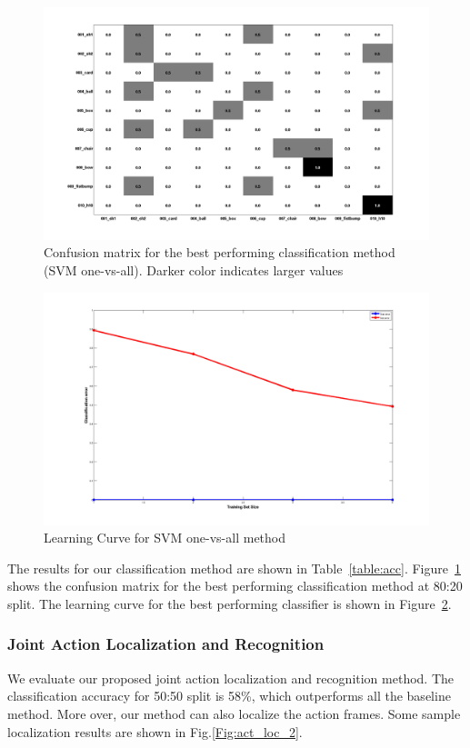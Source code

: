 \documentclass[10pt,twocolumn,letterpaper]{article}
\begin{document}
\begin{figure}[ht]
\includegraphics[scale=0.18]{conf_svm_ovr.png}
\caption{Confusion matrix for the best performing classification method (SVM one-vs-all). Darker color indicates larger values}
\label{Fig:conf_mat}
\end{figure}

\begin{figure}[ht]
\includegraphics[scale=0.1]{svm_ovr_lc.png}
\caption{Learning Curve for SVM one-vs-all method}

\label{Fig:lc}
\end{figure}

The results for our classification method are shown in Table~\ref{table:acc}. Figure~\ref{Fig:conf_mat} shows the confusion matrix for the best performing classification method at 80:20 split. The learning curve for the best performing classifier is shown in Figure~\ref{Fig:lc}.

\subsubsection{Joint Action Localization and Recognition}
We evaluate our proposed joint action localization and recognition method. The classification accuracy for 50:50 split is 58\%, which outperforms all the baseline method. More over, our method can also localize the action frames. Some sample localization results are shown in Fig.\ref{Fig:act_loc_2}.
\end{document}
